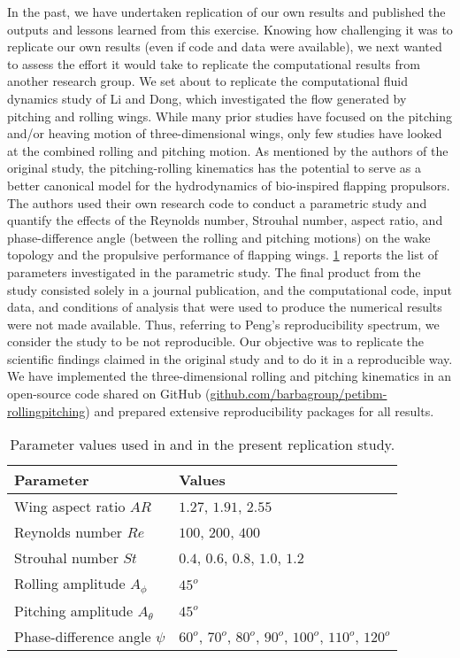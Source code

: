 In the past, we have undertaken replication of our own results\supercite{krishnan_et_al_2014} and published the outputs and lessons learned from this exercise.\supercite{mesnard_barba_2017}
Knowing how challenging it was to replicate our own results (even if code and data were available), we next wanted to assess the effort it would take to replicate the computational results from another research group.
We set about to replicate the computational fluid dynamics study of Li and Dong,\supercite{li_dong_2016} which investigated the flow generated by pitching and rolling wings.
While many prior studies have focused on the pitching and/or heaving motion of three-dimensional wings, only few studies have looked at the combined rolling and pitching motion.
As mentioned by the authors of the original study, the pitching-rolling kinematics has the potential to serve as a better canonical model for the hydrodynamics of bio-inspired flapping propulsors.
The authors used their own research code to conduct a parametric study and quantify the effects of the Reynolds number, Strouhal number, aspect ratio, and phase-difference angle (between the rolling and pitching motions) on the wake topology and the propulsive performance of flapping wings.
\cref{tab:parameters} reports the list of parameters investigated in the parametric study.
The final product from the study consisted solely in a journal publication, and the computational code, input data, and conditions of analysis that were used to produce the numerical results were not made available.
Thus, referring to Peng's reproducibility spectrum, we consider the study to be not reproducible.
Our objective was to replicate the scientific findings claimed in the original study and to do it in a reproducible way.
We have implemented the three-dimensional rolling and pitching kinematics in an open-source code shared on GitHub (\url{github.com/barbagroup/petibm-rollingpitching}) and prepared extensive reproducibility packages for all results.

\begin{table}%
  \centering
  \begin{tabular}{ll}
    \hline\hline
    Parameter & Values \\
    \hline
    Wing aspect ratio $AR$ & $1.27$, $1.91$, $2.55$ \\
    Reynolds number $Re$ & $100$, $200$, $400$ \\
    Strouhal number $St$ & $0.4$, $0.6$, $0.8$, $1.0$, $1.2$ \\
    Rolling amplitude $A_\phi$ & $45^o$ \\
    Pitching amplitude $A_\theta$ & $45^o$ \\
    Phase-difference angle $\psi$ & $60^o$, $70^o$, $80^o$, $90^o$, $100^o$, $110^o$, $120^o$ \\
    \hline\hline
  \end{tabular}
  \caption{Parameter values used in \citet{li_dong_2016} and in the present replication study.}
  \label{tab:parameters}
\end{table}



